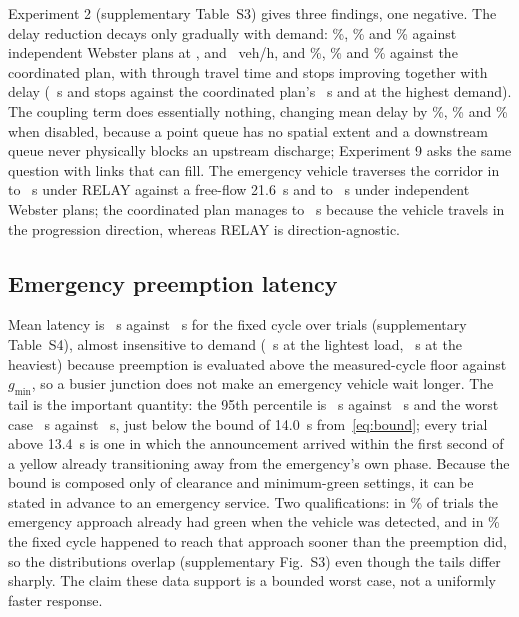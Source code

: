 \documentclass[journal]{IEEEtran}
\newcommand{\relay}{RELAY}
\begin{document}
Experiment 2 (supplementary Table~S3) gives three findings, one negative. The delay reduction decays only
gradually with demand: \CorrRedWebsterLow\%, \CorrRedWebsterMid\% and \CorrRedWebsterHigh\% against
independent Webster plans at \CorrDemandLow, \CorrDemandMid{} and \CorrDemandHigh~veh/h, and
\CorrRedCoordLow\%, \CorrRedCoordMid\% and \CorrRedCoordHigh\% against the coordinated plan, with through
travel time and stops improving together with delay (\CorrTravelRelayHigh~s and \CorrStopsRelayHigh{} stops
against the coordinated plan's \CorrTravelCoordHigh~s and \CorrStopsCoordHigh{} at the highest demand). The
coupling term does essentially nothing, changing mean delay by \CorrRedIsolatedLow\%, \CorrRedIsolatedMid\%
and \CorrRedIsolatedHigh\% when disabled, because a point queue has no spatial extent and a downstream queue
never physically blocks an upstream discharge; Experiment 9 asks the same question with links that can fill.
The emergency vehicle traverses the corridor in \CorrAmbRelayMin{} to \CorrAmbRelayMax~s under \relay{}
against a free-flow 21.6~s and \CorrAmbWebsterMin{} to \CorrAmbWebsterMax~s under independent Webster plans;
the coordinated plan manages \CorrAmbCoordMin{} to \CorrAmbCoordMax~s because the vehicle travels in the
progression direction, whereas \relay{} is direction-agnostic.

\subsection{Emergency preemption latency}

Mean latency is \PreMeanRelay~s against \PreMeanFixed~s for the fixed cycle over \PreTrials{} trials
(supplementary Table~S4), almost insensitive to demand (\PreLightMean~s at the lightest load,
\PreHeavyMean~s at the heaviest) because preemption is evaluated above the measured-cycle floor against
$g_{\min}$, so a busier junction does not make an emergency vehicle wait longer. The tail is the important
quantity: the 95th percentile is \PreAllRelayPNinetyFive~s against \PreAllFixedPNinetyFive~s and the worst
case \PreWorstRelay~s against \PreWorstFixed~s, just below the bound of 14.0~s from~\eqref{eq:bound}; every
trial above 13.4~s is one in which the announcement arrived within the first second of a yellow already
transitioning away from the emergency's own phase. Because the bound is composed only of clearance and
minimum-green settings, it can be stated in advance to an emergency service. Two qualifications: in
\PreAlreadyGreenPct\% of trials the emergency approach already had green when the vehicle was detected, and
in \PreFixedSoonerPct\% the fixed cycle happened to reach that approach sooner than the preemption did, so
the distributions overlap (supplementary Fig.~S3) even though the tails differ sharply. The claim these data
support is a bounded worst case, not a uniformly faster response.
\end{document}
